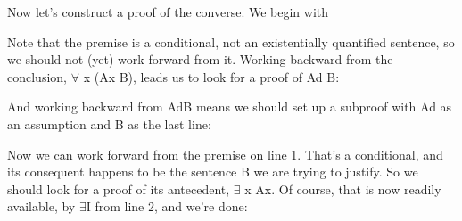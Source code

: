 Now let’s construct a proof of the converse. We begin with

\begin{fitchproof}
\ellipsesline
{}
\end{fitchproof}

Note that the premise is a conditional, not an existentially quantified sentence, so we should not (yet) work forward from it. Working backward from the conclusion, $\forall$ x (Ax \eif  B), leads us to look for a proof of Ad \eif  B:
\begin{fitchproof}
\ellipsesline
{}
\end{fitchproof}

And working backward from Ad\eif  B means we should set up a subproof with Ad as an assumption and B as the last line:
\begin{fitchproof}
\open
{}
\ellipsesline
{}
\close
{}
\end{fitchproof}

Now we can work forward from the premise on line 1. That’s a conditional, and its consequent happens to be the sentence B we are trying to justify. So we should look for a proof of its antecedent, $\exists$ x Ax. Of course, that is now readily available, by $\exists$I from line 2, and we’re done:
\begin{fitchproof}
\open
{}
\close
{}
\end{fitchproof}

